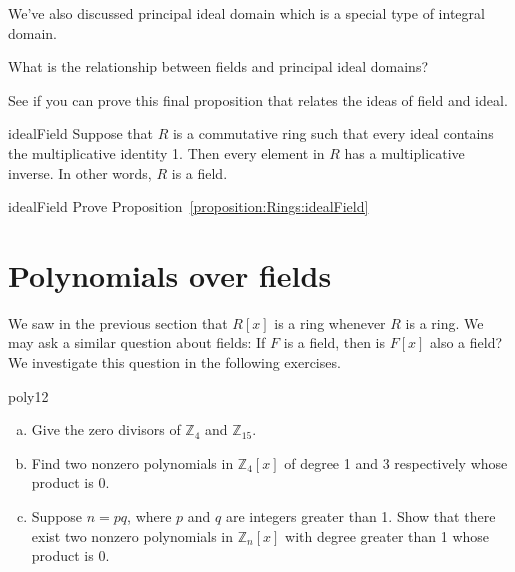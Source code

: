 We've also discussed principal ideal domain which is a special type of integral domain.

\begin{exercise}{}
What is the relationship between fields and principal ideal domains?
\end{exercise}

See if you can prove this final proposition that relates the ideas of field and ideal. 

\begin{prop}{idealField}
Suppose that $R$ is a commutative ring such that every ideal contains the multiplicative identity 1. Then every element in $R$ has a multiplicative inverse. In other words, $R$ is a field.\\
\end{prop}

\begin{exercise}{idealField}
Prove Proposition~\ref{proposition:Rings:idealField}
\end{exercise}


\section{Polynomials over fields}
\label{sec:Rings:PolynomialOverFields}

We saw in the previous section that  $R[x]$ is a ring whenever $R$ is a ring. We may ask a similar question about fields: If $F$ is a field, then is $F[x]$ also a field? We investigate this question in the following exercises.


\begin{exercise}{poly12}
\begin{enumerate}[(a)]
\item  Give the zero divisors of ${\mathbb Z}_4$ and ${\mathbb Z}_{15}$.
\item
Find two nonzero polynomials in $\mathbb{Z}_4[x]$ of degree 1 and 3 respectively  whose product is 0.
\item
Suppose $n=pq$, where $p$ and $q$ are integers greater than 1. Show that there exist two nonzero polynomials in $\mathbb{Z}_n[x]$ with degree greater than 1 whose product is 0.
\end{enumerate}
\end{exercise}

